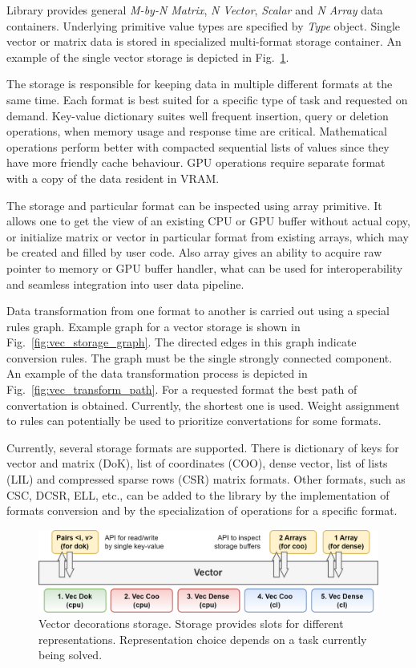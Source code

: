 Library provides general \textit{M-by-N Matrix}, \textit{N Vector}, \textit{Scalar} and \textit{N Array} data containers. Underlying primitive value types are specified by \textit{Type} object. Single vector or matrix data is stored in specialized multi-format storage container. An example of the single vector storage is depicted in Fig.~\ref{fig:vec_storage}. 

The storage is responsible for keeping data in multiple different formats at the same time. Each format is best suited for a specific type of task and requested on demand. Key-value dictionary suites well frequent insertion, query or deletion operations, when memory usage and response time are critical. Mathematical operations perform better with compacted sequential lists of values since they have more friendly cache behaviour. GPU operations require separate format with a copy of the data resident in VRAM.

The storage and particular format can be inspected using array primitive. It allows one to get the view of an existing CPU or GPU buffer without actual copy, or initialize matrix or vector in particular format from existing arrays, which may be created and filled by user code. Also array gives an ability to acquire raw pointer to memory or GPU buffer handler, what can be used for interoperability and seamless integration into user data pipeline.

Data transformation from one format to another is carried out using a special rules graph. Example graph for a vector storage is shown in Fig.~\ref{fig:vec_storage_graph}. The directed edges in this graph indicate conversion rules. The graph must be the single strongly connected component. An example of the data transformation process is depicted in Fig.~\ref{fig:vec_transform_path}.  For a requested format the best path of convertation is obtained. Currently, the shortest one is used. Weight assignment to rules can potentially be used to prioritize convertations for some formats. 

Currently, several storage formats are supported. There is dictionary of keys for vector and matrix (DoK), list of coordinates (COO), dense vector, list of lists (LIL) and compressed sparse rows (CSR) matrix formats. Other formats, such as CSC, DCSR, ELL, etc., can be added to the library by the implementation of formats conversion and by the specialization of operations for a specific format. 

\begin{figure}
    \centering
    \includegraphics[width=1.0\textwidth]{images/spla_vector_storage.png}
    \caption{Vector decorations storage. Storage provides slots for different representations. Representation choice depends on a task currently being solved.}
    \label{fig:vec_storage}
\end{figure} 

